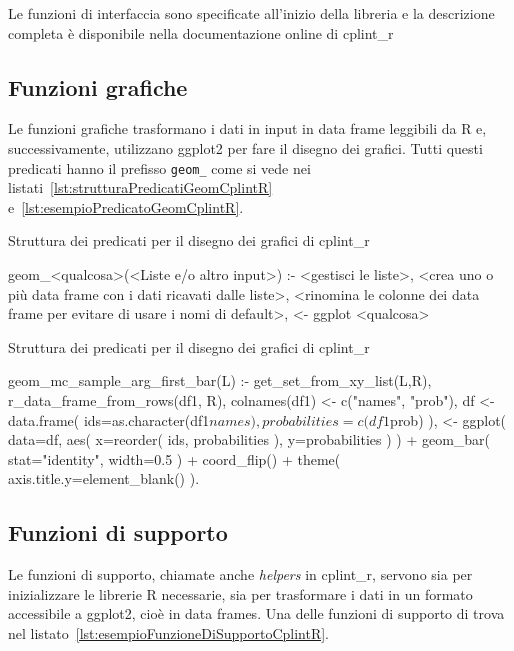 \documentclass[10pt,titlepage,twoside,a4paper]{report}
\newenvironment{code}{\singlespacing\captionsetup{type=listing}}{}
\begin{document}
Le funzioni di interfaccia sono specificate all'inizio della libreria e la 
descrizione completa è disponibile nella documentazione online di 
cplint\_r~\cite{cplintRInterface}

\subsection{Funzioni grafiche}
Le funzioni grafiche trasformano i dati in input in data frame leggibili da R 
e, successivamente, utilizzano ggplot2 per fare il disegno dei grafici. Tutti
questi predicati hanno il prefisso \texttt{geom\_} come si vede nei 
listati~\ref{lst:strutturaPredicatiGeomCplintR}
e~\ref{lst:esempioPredicatoGeomCplintR}.

\begin{code}
    \caption{Struttura dei predicati per il disegno dei grafici di cplint\_r}
    \label{lst:strutturaPredicatiGeomCplintR}
    \begin{prologcode*}{}
geom_<qualcosa>(<Liste e/o altro input>) :-
    <gestisci le liste>,
    <crea uno o più data frame con i dati ricavati dalle liste>,
    <rinomina le colonne dei data frame per evitare di usare i nomi di default>,
    <- ggplot <qualcosa>
    \end{prologcode*}
\end{code}

\begin{code}
    \caption{Struttura dei predicati per il disegno dei grafici di cplint\_r}
    \label{lst:esempioPredicatoGeomCplintR}
    \begin{prologcode*}{}
geom_mc_sample_arg_first_bar(L) :-
    get_set_from_xy_list(L,R),
    r_data_frame_from_rows(df1, R),
    colnames(df1) <- c("names", "prob"),
    df <- data.frame(
        ids=as.character(df1$names),
        probabilities=c(df1$prob)
    ),
    <- ggplot(
        data=df,
        aes(
            x=reorder(
                ids,
                probabilities
            ),
            y=probabilities
        )
    ) + geom_bar(
        stat="identity",
        width=0.5
    )
    + coord_flip() + theme(
        axis.title.y=element_blank()
    ).
\end{prologcode*}
\end{code}

\subsection{Funzioni di supporto}
Le funzioni di supporto, chiamate anche \emph{helpers} in cplint\_r, servono 
sia per inizializzare le librerie R necessarie, sia per trasformare i dati in 
un formato accessibile a ggplot2, cioè in data frames. Una delle funzioni di
supporto di trova nel listato~\ref{lst:esempioFunzioneDiSupportoCplintR}.
\end{document}
